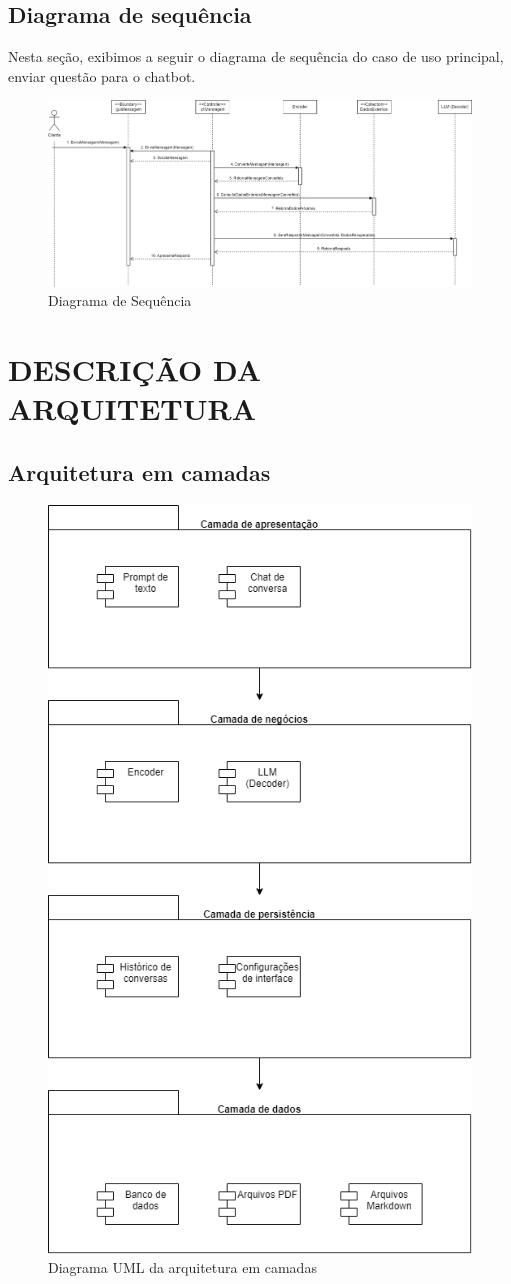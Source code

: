 \documentclass[
	12pt,				%
	openright,			%
	oneside,			    %
	a4paper,				%
	english,			%
	french,			%
	spanish,			%
	brazil			%
	]{abntex2}
\begin{document}
\clearpage
\section{Diagrama de sequência}
Nesta seção, exibimos a seguir o diagrama de sequência do caso de uso principal, enviar questão para o chatbot.

\begin{figure}[h]
    \centering
    \includegraphics[width=1\linewidth]{Diagrama de Sequencia.drawio.png}
    \caption{Diagrama de Sequência}
    \label{fig:enter-label}
\end{figure}

\chapter{DESCRIÇÃO DA ARQUITETURA}

\section{Arquitetura em camadas}

\begin{figure}[h]
    \centering
    \includegraphics[width=0.5\linewidth]{ArquiteturaCamadas.drawio.png}
    \caption{Diagrama UML da arquitetura em camadas}
    \label{fig:enter-label}
\end{figure}
\end{document}
